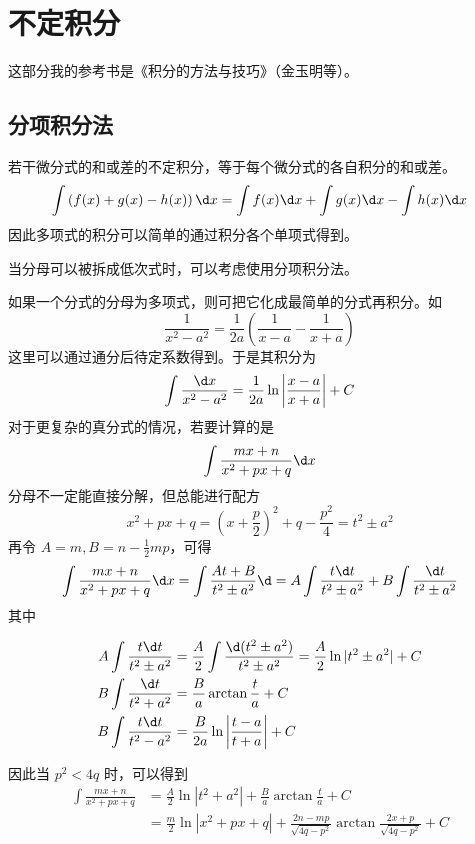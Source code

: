 \section{不定积分}

这部分我的参考书是《积分的方法与技巧》（金玉明等）。

\subsection{分项积分法}

若干微分式的和或差的不定积分，等于每个微分式的各自积分的和或差。
\[ \int\left( f(x)+g(x)-h(x) \right)\d x = \int f(x)\d x + \int g(x)\d x - \int h(x)\d x \]
因此多项式的积分可以简单的通过积分各个单项式得到。

当分母可以被拆成低次式时，可以考虑使用分项积分法。

如果一个分式的分母为多项式，则可把它化成最简单的分式再积分。如
\[ \frac{1}{x^2-a^2} = \frac{1}{2a}\left( \frac{1}{x-a}-\frac{1}{x+a} \right) \]
这里可以通过通分后待定系数得到。于是其积分为
\[ \int \frac{\d x}{x^2-a^2} = \frac{1}{2a}\ln\left|\frac{x-a}{x+a}\right|+C \]
对于更复杂的真分式的情况，若要计算的是
\[ \int \frac{mx+n}{x^2+px+q} \d x \]
分母不一定能直接分解，但总能进行配方
\[ x^2+px+q = \left(x+\frac{p}{2}\right)^2+q-\frac{p^2}{4} = t^2 \pm a^2 \]
再令 $A=m,B=n-\frac12mp$，可得
\[ \int \frac{mx+n}{x^2+px+q} \d x = \int \frac{At+B}{t^2 \pm a^2} \d
	= A\int \frac{t\d t}{t^2 \pm a^2} + B\int \frac{\d t}{t^2 \pm a^2}\]
其中

\[
	\begin{aligned}
		A\int \frac{t \d t}{t^2 \pm a^2} & = \frac{A}{2}\int \frac{\d(t^2 \pm a^2)}{t^2 \pm a^2} = \frac{A}{2} \ln|t^2 \pm a^2| +C \\
		B\int \frac{\d t}{t^2 + a^2}     & = \frac{B}{a}\arctan\frac{t}{a}+C                                                       \\
		B\int \frac{t \d t}{t^2 - a^2}   & = \frac{B}{2a}\ln\left|\frac{t-a}{t+a}\right|+C
	\end{aligned}
\]

因此当 $p^2<4q$ 时，可以得到
\[
	\begin{aligned}
		\int \frac{mx+n}{x^2+px+q} & = \frac{A}{2} \ln|t^2 + a^2| + \frac{B}{a}\arctan\frac{t}{a} + C                               \\
		                           & =\frac{m}{2}\ln|x^2+px+q| + \frac{2n-mp}{\sqrt{4q-p^2}}\arctan{\frac{2x+p}{\sqrt{4q-p^2}}} + C
	\end{aligned}
\]

